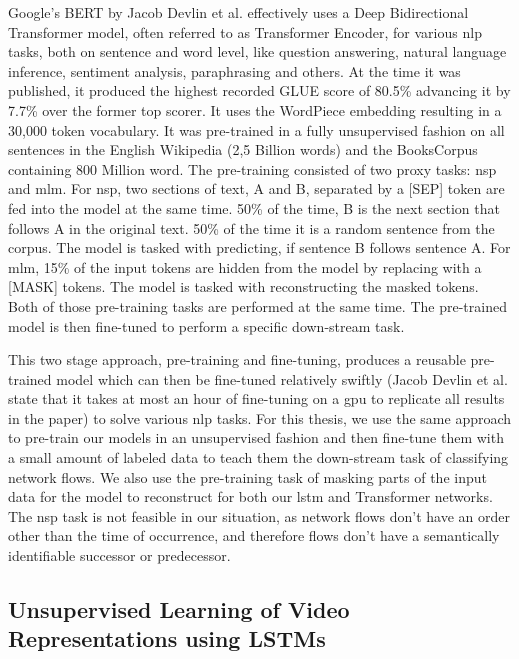 Google's BERT \cite{bert} by Jacob Devlin et al. effectively uses a Deep Bidirectional Transformer model, often referred to as Transformer Encoder, for various \gls{nlp} tasks, both on sentence and word level, like question answering, natural language inference, sentiment analysis, paraphrasing and others. At the time it was published, it produced the highest recorded GLUE \cite{glue} score of 80.5\% advancing it by 7.7\% over the former top scorer. It uses the WordPiece \cite{wordpiece} embedding resulting in a 30,000 token vocabulary. It was pre-trained in a fully unsupervised fashion on all sentences in the English Wikipedia (2,5 Billion words) and the BooksCorpus \cite{books_corpus} containing 800 Million word. The pre-training consisted of two proxy tasks: \gls{nsp} and \gls{mlm}. For \gls{nsp}, two sections of text, A and B, separated by a [SEP] token are fed into the model at the same time. 50\% of the time, B is the next section that follows A in the original text. 50\% of the time it is a random sentence from the corpus. The model is tasked with predicting, if sentence B follows sentence A. For \gls{mlm}, 15\% of the input tokens are hidden from the model by replacing with a [MASK] tokens. The model is tasked with reconstructing the masked tokens. Both of those pre-training tasks are performed at the same time. The pre-trained model is then fine-tuned to perform a specific down-stream task. \par
This two stage approach, pre-training and fine-tuning, produces a reusable pre-trained model which can then be fine-tuned relatively swiftly (Jacob Devlin et al. state that it takes at most an hour of fine-tuning on a \gls{gpu} to replicate all results in the paper) to solve various \gls{nlp} tasks. For this thesis, we use the same approach to pre-train our models in an unsupervised fashion and then fine-tune them with a small amount of labeled data to teach them the down-stream task of classifying network flows. We also use the pre-training task of masking parts of the input data for the model to reconstruct for both our \gls{lstm} and Transformer networks. The \gls{nsp} task is not feasible in our situation, as network flows don't have an order other than the time of occurrence, and therefore flows don't have a semantically identifiable successor or predecessor.

\subsection{Unsupervised Learning of Video Representations using LSTMs} \label{sec:stateofart:unsupervised_video_lstm}

